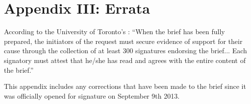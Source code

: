 \documentclass[10pt]{article}
\begin{document}






\clearpage



		\singlespacing
		\section{Appendix III: Errata}
		\label{sec:Errata}
		\doublespacing



According to the University of Toronto's : ``When the brief has been fully prepared, the initiators of the request must secure evidence of support for their cause through the collection of at least 300 signatures endorsing the brief... Each signatory must attest that he/she has read and agrees with the entire content of the brief.''



This appendix includes any corrections that have been made to the brief since it was officially opened for signature on September 9th 2013.



\end{document}
